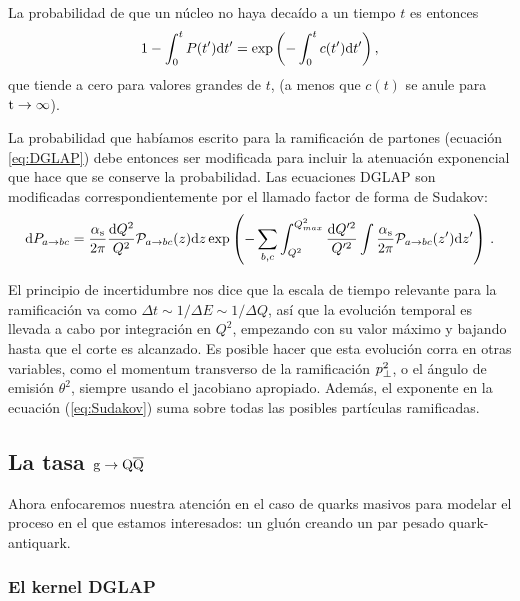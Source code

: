 \documentclass[a4paper,12pt]{article}
\begin{document}
La probabilidad de que un núcleo no haya decaído a un tiempo $t$ es entonces
$$1- \int_0^t P(t'){\mathrm d} t' = \exp \left(-\int_0^t c(t'){\mathrm d} t' \right),$$
que tiende a cero para valores grandes de $t$, (a menos que $c(t)$ se anule para ${\mathrm t}\to\infty$).

La probabilidad que habíamos escrito para la ramificación de partones (ecuación \ref{eq:DGLAP}) debe entonces ser modificada para incluir la atenuación exponencial que hace que se conserve la probabilidad. Las ecuaciones DGLAP son modificadas correspondientemente por el llamado factor de forma de Sudakov:
\begin{equation}
  {\mathrm d} P_{a\to bc} = \frac{\alpha_{\mathrm{s}}}{2\pi}\frac{{\mathrm d} Q^2}{Q^2}\mathcal{P}_{a\to bc}(z) {\mathrm d} z \exp \left( -\sum_{b,c}\int^{Q^2_{max}}_{Q^2}\frac{{\mathrm d} Q'^2}{Q'^2} \int \frac{\alpha_{\mathrm{s}}}{2\pi} \mathcal{P}_{a\to bc}(z') {\mathrm d} z' \right)
  \label{eq:Sudakov}
  \, .
\end{equation}

El principio de incertidumbre nos dice que la escala de tiempo relevante para la ramificación va como $\Delta t \sim 1/\Delta E \sim 1/\Delta Q$, así que la evolución temporal es llevada a cabo por integración en $Q^2$, empezando con su valor máximo y bajando hasta que el corte es alcanzado. Es posible hacer que esta evolución corra en otras variables, como el momentum transverso de la ramificación $p_{\perp}^2$, o el ángulo de emisión $\theta^2$, siempre usando el jacobiano apropiado. Además, el exponente en la ecuación (\ref{eq:Sudakov}) suma sobre todas las posibles partículas ramificadas.

\subsection{La tasa ${\mathrm g}\to{\mathrm Q}\overline{\mathrm Q}$}

Ahora enfocaremos nuestra atención en el caso de quarks masivos para modelar el proceso en el que estamos interesados: un gluón creando un par pesado quark-antiquark.

\subsubsection{El kernel DGLAP}
\end{document}

